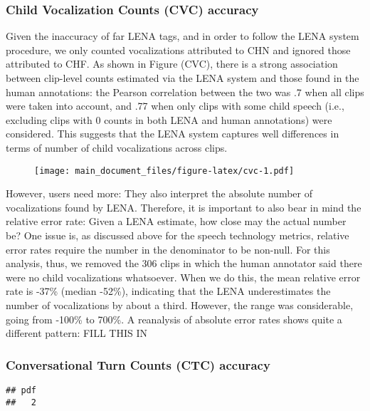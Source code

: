 \documentclass[english,floatsintext,man]{apa6}
\begin{document}
\subsubsection{Child Vocalization Counts (CVC)
accuracy}\label{child-vocalization-counts-cvc-accuracy}

Given the inaccuracy of far LENA tags, and in order to follow the LENA
system procedure, we only counted vocalizations attributed to CHN and
ignored those attributed to CHF. As shown in Figure (CVC), there is a
strong association between clip-level counts estimated via the LENA
system and those found in the human annotations: the Pearson correlation
between the two was .7 when all clips were taken into account, and .77
when only clips with some child speech (i.e., excluding clips with 0
counts in both LENA and human annotations) were considered. This
suggests that the LENA system captures well differences in terms of
number of child vocalizations across clips.

\begin{figure}
\centering
\texttt{[image: main\_document\_files/figure-latex/cvc-1.pdf]}
\caption{}
\end{figure}

However, users need more: They also interpret the absolute number of
vocalizations found by LENA. Therefore, it is important to also bear in
mind the relative error rate: Given a LENA estimate, how close may the
actual number be? One issue is, as discussed above for the speech
technology metrics, relative error rates require the number in the
denominator to be non-null. For this analysis, thus, we removed the 306
clips in which the human annotator said there were no child
vocalizations whatsoever. When we do this, the mean relative error rate
is -37\% (median -52\%), indicating that the LENA underestimates the
number of vocalizations by about a third. However, the range was
considerable, going from -100\% to 700\%. A reanalysis of absolute error
rates shows quite a different pattern: FILL THIS IN

\subsubsection{Conversational Turn Counts (CTC)
accuracy}\label{conversational-turn-counts-ctc-accuracy}

\begin{verbatim}
## pdf 
##   2
\end{verbatim}
\end{document}
